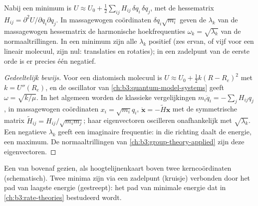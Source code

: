 \begin{proposition}\label{prop:b3:computational-chemistry:hessian}
Nabij een minimum is $U \approx U_0 + \frac12\sum_{ij}H_{ij}\,\delta q_i\,\delta q_j$, met
de hessematrix $H_{ij} = \partial^2U/\partial q_i\partial q_j$. In massagewogen
coördinaten $\delta q_i\sqrt{m_i}$ geven de  $\lambda_k$ van de
massagewogen hessematrix de harmonische hoekfrequenties $\omega_k =
\sqrt{\lambda_k}$ van de normaaltrillingen. In een minimum zijn alle $\lambda_k$
positief (zes ervan, of vijf voor een lineair molecuul, zijn nul:
translaties en rotaties); in een zadelpunt van de eerste orde is er precies
één negatief.
\end{proposition}

\begin{proof}[Gedeeltelijk bewijs]
Voor een diatomisch molecuul is $U \approx U_0 + \frac12k(R - R_e)^2$ met $k = U''(R_e)$, en
de oscillator van \cref{ch:b3:quantum-model-systems} geeft $\omega =
\sqrt{k/\mu}$. In het algemeen worden de klassieke vergelijkingen $m_i\ddot q_i =
-\sum_jH_{ij}q_j$, in massagewogen coördinaten $x_i = \sqrt{m_i}q_i$,
$\ddot{\mathbf x} = -\tilde H\mathbf x$ met de symmetrische matrix $\tilde H_{ij} =
H_{ij}/\sqrt{m_im_j}$; haar eigenvectoren oscilleren onafhankelijk met
$\sqrt{\lambda_k}$. Een negatieve $\lambda_k$ geeft een imaginaire frequentie:
in die richting daalt de energie, een maximum. De normaaltrillingen van
\cref{ch:b3:group-theory-applied} zijn deze eigenvectoren.
\end{proof}

\begin{omfigure}

{\small Een  van bovenaf gezien, als
hoogtelijnenkaart boven twee kerncoördinaten (schematisch). Twee minima
zijn via een zadelpunt (kruisje) verbonden door het pad van laagste
energie (gestreept): het pad van minimale energie dat in
\cref{ch:b3:rate-theories} bestudeerd wordt.}
\end{omfigure}

